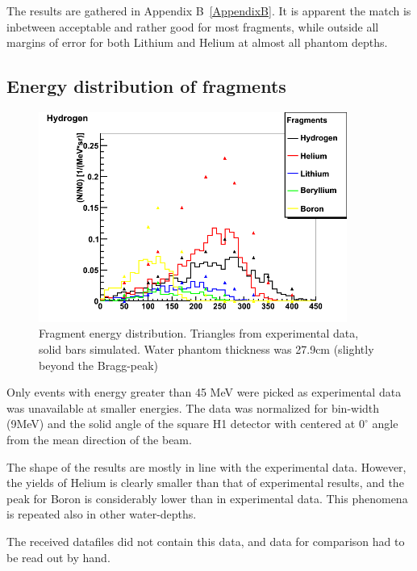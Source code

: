 The results are gathered in Appendix B~\ref{AppendixB}. It is apparent the match is inbetween acceptable and rather good for most fragments, while outside all margins of error for both Lithium and Helium at almost all phantom depths.



\subsection{Energy distribution of fragments}
\begin{figure}[h] 
\begin{center}
\includegraphics[width=0.9\textwidth]{images/fragmentEnergyDistr.png}  
\caption{\label{fig:fragmentEnergyDistr} Fragment energy distribution. Triangles from experimental data, solid bars simulated. Water phantom thickness was 27.9cm (slightly beyond the Bragg-peak)}
\end{center}
\end{figure}
Only events with energy greater than 45 MeV were picked as experimental data was unavailable at smaller energies. The data was normalized for bin-width (9MeV) and the solid angle of the square H1 detector with centered at $0^{\circ}$ angle from the mean direction of the beam.

The shape of the results are mostly in line with the experimental data. However, the yields of Helium is clearly smaller than that of experimental results, and the peak for Boron is considerably lower than in experimental data. This phenomena is repeated also in other water-depths.

The received datafiles did not contain this data, and data for comparison had to be read out by hand.

